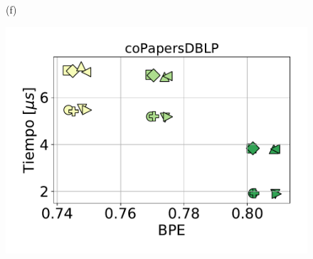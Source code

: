 \begin{figure}
\begin{minipage}{1\textwidth}
\begin{minipage}{0.45\textwidth}
    			(f)
    		\end{minipage}  
    	\end{minipage}
    	
	\begin{minipage}{1\textwidth}
    		\centering
    		\begin{minipage}{0.45\textwidth}
    			\centering
    			\begin{minipage}{0.75\textwidth}
    				\centering
    				\includegraphics[width=1\linewidth]{img/sdsl/aleatorio/coPapersDBLP.pdf}
    			\end{minipage}
    			\begin{minipage}{0.2\textwidth}
    				\centering

\end{minipage}
\end{minipage}
\end{minipage}
\end{figure}
